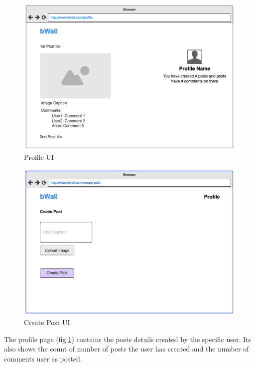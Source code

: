 \documentclass[12pt]{report}
\begin{document}
\begin{figure}[H]
\centering
\includegraphics[width=12cm]{uiviewprofile.png}
\caption{Profile UI}
\label{fig:profileui}
\end{figure}
\begin{figure}[H]
\centering
\includegraphics[width=12cm]{uicreatepost.png}
\caption{Create Post UI}
\label{fig:createpostui}
\end{figure}

The profile page (fig:\ref{fig:profileui}) contains the posts details created by the specific user. Its also shows the count of number of posts the user has created and the number of comments user as posted.
\end{document}
